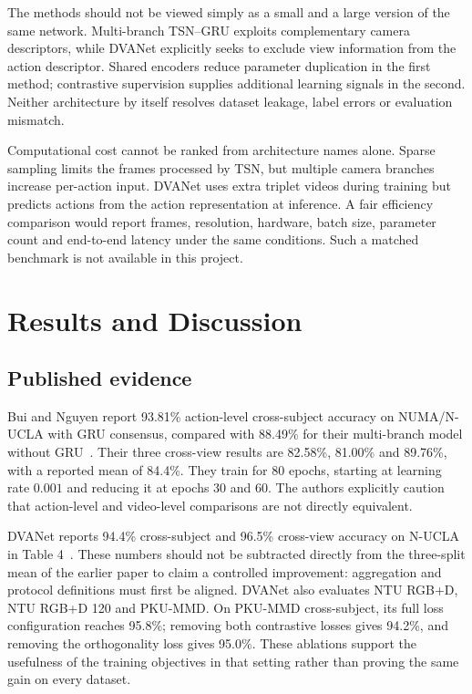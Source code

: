 \documentclass[runningheads]{llncs}
\begin{document}
The methods should not be viewed simply as a small and a large version of the same network. Multi-branch TSN--GRU exploits complementary camera descriptors, while DVANet explicitly seeks to exclude view information from the action descriptor. Shared encoders reduce parameter duplication in the first method; contrastive supervision supplies additional learning signals in the second. Neither architecture by itself resolves dataset leakage, label errors or evaluation mismatch.

Computational cost cannot be ranked from architecture names alone. Sparse sampling limits the frames processed by TSN, but multiple camera branches increase per-action input. DVANet uses extra triplet videos during training but predicts actions from the action representation at inference. A fair efficiency comparison would report frames, resolution, hardware, batch size, parameter count and end-to-end latency under the same conditions. Such a matched benchmark is not available in this project.

\section{Results and Discussion}
\subsection{Published evidence}
Bui and Nguyen report 93.81\% action-level cross-subject accuracy on NUMA/N-UCLA with GRU consensus, compared with 88.49\% for their multi-branch model without GRU~\cite{bui}. Their three cross-view results are 82.58\%, 81.00\% and 89.76\%, with a reported mean of 84.4\%. They train for 80 epochs, starting at learning rate $0.001$ and reducing it at epochs 30 and 60. The authors explicitly caution that action-level and video-level comparisons are not directly equivalent.

DVANet reports 94.4\% cross-subject and 96.5\% cross-view accuracy on N-UCLA in Table 4~\cite{dva}. These numbers should not be subtracted directly from the three-split mean of the earlier paper to claim a controlled improvement: aggregation and protocol definitions must first be aligned. DVANet also evaluates NTU RGB+D, NTU RGB+D 120 and PKU-MMD. On PKU-MMD cross-subject, its full loss configuration reaches 95.8\%; removing both contrastive losses gives 94.2\%, and removing the orthogonality loss gives 95.0\%. These ablations support the usefulness of the training objectives in that setting rather than proving the same gain on every dataset.
\end{document}
